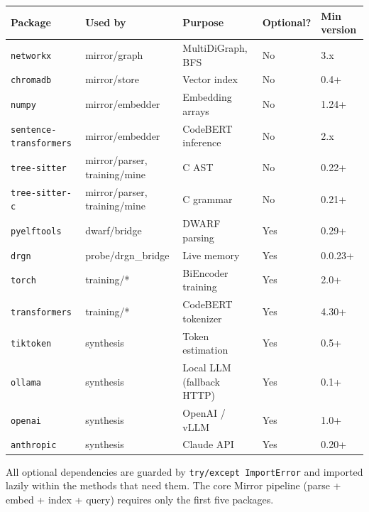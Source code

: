 \documentclass[11pt,a4paper]{article}
\begin{document}
\begin{center}
\renewcommand{\arraystretch}{1.2}
\begin{tabular}{@{}lllll@{}}
\toprule
\textbf{Package} & \textbf{Used by} & \textbf{Purpose} & \textbf{Optional?} & \textbf{Min version} \\
\midrule
\texttt{networkx}           & mirror/graph    & MultiDiGraph, BFS       & No  & 3.x \\
\texttt{chromadb}           & mirror/store    & Vector index            & No  & 0.4+ \\
\texttt{numpy}              & mirror/embedder & Embedding arrays        & No  & 1.24+ \\
\texttt{sentence-transformers} & mirror/embedder & CodeBERT inference  & No  & 2.x \\
\texttt{tree-sitter}        & mirror/parser, training/mine & C AST & No  & 0.22+ \\
\texttt{tree-sitter-c}      & mirror/parser, training/mine & C grammar & No & 0.21+ \\
\texttt{pyelftools}         & dwarf/bridge    & DWARF parsing           & Yes & 0.29+ \\
\texttt{drgn}               & probe/drgn\_bridge & Live memory         & Yes & 0.0.23+ \\
\texttt{torch}              & training/*      & BiEncoder training      & Yes & 2.0+ \\
\texttt{transformers}       & training/*      & CodeBERT tokenizer      & Yes & 4.30+ \\
\texttt{tiktoken}           & synthesis       & Token estimation        & Yes & 0.5+ \\
\texttt{ollama}             & synthesis       & Local LLM (fallback HTTP) & Yes & 0.1+ \\
\texttt{openai}             & synthesis       & OpenAI / vLLM           & Yes & 1.0+ \\
\texttt{anthropic}          & synthesis       & Claude API              & Yes & 0.20+ \\
\bottomrule
\end{tabular}
\end{center}

All optional dependencies are guarded by \texttt{try/except ImportError} and
imported lazily within the methods that need them. The core Mirror pipeline
(parse + embed + index + query) requires only the first five packages.

\end{document}
